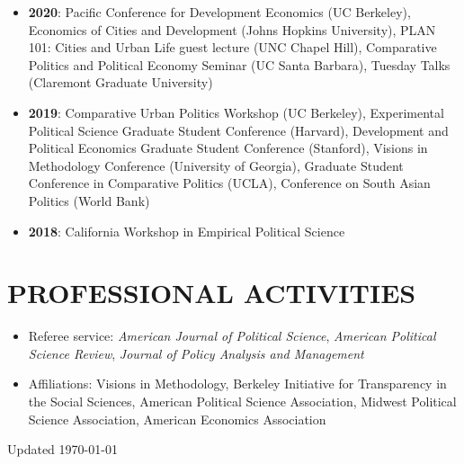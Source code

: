 \documentclass[10pt]{article}
\begin{document}
\begin{itemize}[nosep]
\item[] \textbf{2020}: Pacific Conference for Development Economics (UC Berkeley), Economics of Cities and Development (Johns Hopkins University), PLAN 101: Cities and Urban Life guest lecture (UNC Chapel Hill), Comparative Politics and Political Economy Seminar (UC Santa Barbara), Tuesday Talks (Claremont Graduate University)
\item[] \textbf{2019}: Comparative Urban Politics Workshop (UC Berkeley), Experimental Political Science Graduate Student Conference (Harvard), Development and Political Economics Graduate Student Conference (Stanford), Visions in Methodology Conference (University of Georgia), Graduate Student Conference in Comparative Politics (UCLA), Conference on South Asian Politics (World Bank)
\item[] \textbf{2018}: California Workshop in Empirical Political Science
\end{itemize}

\vspace{3mm}
\section*{PROFESSIONAL ACTIVITIES}


\begin{itemize}	

\item[]Referee service: \textit{American Journal of Political Science}, \textit{American Political Science Review}, \textit{Journal of Policy Analysis and Management}
\item[]Affiliations: Visions in Methodology, Berkeley Initiative for Transparency in the Social Sciences, American Political Science Association, Midwest Political Science Association, American Economics Association
\end{itemize}









\vspace*{\fill}

Updated \today
\end{document}
